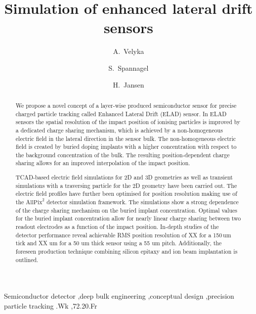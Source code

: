 \documentclass[preprint]{elsarticle}
\newcommand{\Allpixsquared}{\ensuremath{\textrm{AllPix}^{2}}}
\begin{document}
\begin{frontmatter}


\title{Simulation of enhanced lateral drift sensors}

\author[desy]{A.~Velyka}
\address[desy]{Notkestr. 85, 22607 Hamburg, Germany}

\author[cern]{S.~Spannagel}
\address[cern]{Route de , Geneva, Switzerland}

\author[desy]{H.~Jansen}



\begin{abstract}
We propose a novel concept of a layer-wise produced semiconductor sensor for precise charged particle tracking called Enhanced Lateral Drift (ELAD) sensor. 
In ELAD sensors the spatial resolution of the impact position of ionising particles is improved by a dedicated charge sharing mechanism,
 which is achieved by a non-homogeneous electric field in the lateral direction in the sensor bulk. 
The non-homogeneous electric field is created by buried doping implants with a higher concentration with respect to the background concentration of the bulk. 
The resulting position-dependent charge sharing allows for an improved interpolation of the impact position. 

TCAD-based electric field simulations for 2D and 3D geometries as well as transient simulations with a traversing particle for the 2D geometry have been carried out.
The electric field profiles have further been optimised for position resolution making use of the $\Allpixsquared$ detector simulation framework.
The simulations show a strong dependence of the charge sharing mechanism on the buried implant concentration.
Optimal values for the buried implant concentration allow for nearly linear charge sharing between two readout electrodes as a function of the impact position.
In-depth studies of the detector performance reveal achievable RMS position resolution of XX for a 150\,um tick and XX um for a 50 um thick sensor using a 55 um pitch. 
Additionally, the foreseen production technique combining silicon epitaxy and ion beam implantation is outlined.
\end{abstract}

\begin{keyword}
Semiconductor detector \sep deep bulk engineering \sep conceptual design \sep precision particle tracking
.Wk \sep 72.20.Fr
\end{keyword}

\end{frontmatter}
\end{document}
